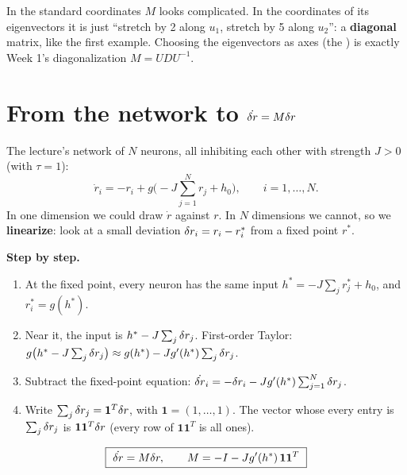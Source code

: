 \begin{center}
\end{center}

\begin{intuition}
In the standard coordinates $M$ looks complicated. In the coordinates of its eigenvectors it is just ``stretch by 2 along $u_1$, stretch by 5 along $u_2$'': a \textbf{diagonal} matrix, like the first example.
Choosing the eigenvectors as axes (the ) is exactly Week 1's diagonalization $M=UDU^{-1}$.
\end{intuition}

\section{From the network to $\dot{\delta r}=M\delta r$}

The lecture's network of $N$ neurons, all inhibiting each other with strength $J>0$ (with $\tau=1$):
\[ \dot r_i=-r_i+g\Big(-J\sum_{j=1}^Nr_j+h_0\Big),\qquad i=1,\dots,N. \]
In one dimension we could draw $\dot r$ against $r$. In $N$ dimensions we cannot, so we \textbf{linearize}: look at a small deviation $\delta r_i=r_i-r^*_i$ from a fixed point $r^*$.

\textbf{Step by step.}
\begin{enumerate}
  \item At the fixed point, every neuron has the same input $h^*=-J\sum_jr^*_j+h_0$, and $r^*_i=g(h^*)$.
  \item Near it, the input is $h^*-J\sum_j\delta r_j$. First-order Taylor: $g\big(h^*-J\sum_j\delta r_j\big)\approx g(h^*)-Jg'(h^*)\sum_j\delta r_j$.
  \item Subtract the fixed-point equation: $\dot{\delta r}_i=-\delta r_i-Jg'(h^*)\sum_{j=1}^N\delta r_j$.
  \item Write $\sum_j\delta r_j=\mathbf1^T\delta r$, with $\mathbf1=(1,\dots,1)$. The vector whose every entry is $\sum_j\delta r_j$ is $\mathbf1\mathbf1^T\delta r$ (every row of $\mathbf1\mathbf1^T$ is all ones).
\end{enumerate}
\[ \boxed{\ \dot{\delta r}=M\delta r,\qquad M=-I-Jg'(h^*)\,\mathbf1\mathbf1^T\ } \]

